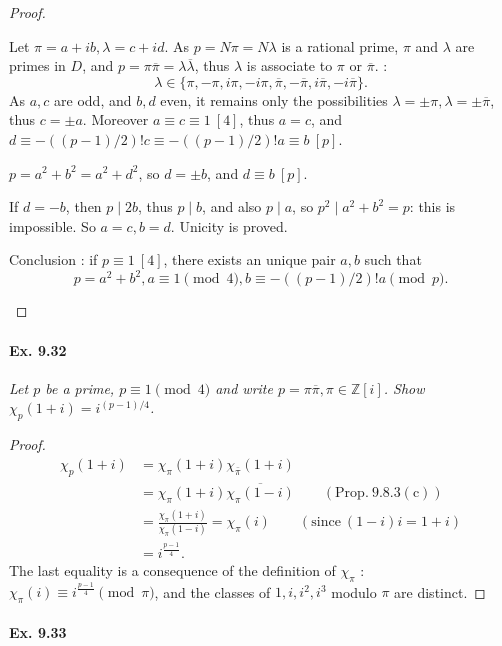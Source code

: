 \documentclass[11pt,a4paper]{article}
\newcommand{\Z}{\mathbb{Z}}
\begin{document}
\begin{proof}
\begin{enumerate}
Let $\pi = a + ib, \lambda = c+id$. As $p = N\pi = N \lambda$ is a rational prime, $\pi$ and $\lambda$ are primes in $D$, and $p = \pi \overline{\pi} = \lambda \overline{\lambda}$, thus $\lambda$ is associate to $\pi$ or $\overline{\pi}$. :
$$\lambda \in \{\pi, - \pi, i \pi, -i\pi, \overline{\pi},-\overline{\pi},i\overline{\pi},-i\overline{\pi}\}.$$
As $a,c$ are odd, and $b,d$ even, it remains only the possibilities $\lambda =\pm \pi, \lambda = \pm \overline{\pi}$, thus $c = \pm a$. Moreover $a \equiv c \equiv 1 \ [4]$, thus $a=c$, and $d \equiv -((p-1)/2)!c \equiv -((p-1)/2)!a \equiv b \ [p]$.

$p=a^2+b^2 = a^2 + d^2$, so $d = \pm b$, and $d \equiv b \ [p]$.

If $d = -b$, then $p\mid 2b$, thus $p \mid b$, and also $p \mid a$, so $p^2 \mid a^2+b^2 = p$: this is impossible. So $a=c,b=d$. Unicity is proved.

Conclusion : if $p\equiv 1 \ [4]$, there exists an unique pair $a,b$ such that
$$p=a^2+b^2, a \equiv 1 \pmod 4, b \equiv -((p-1)/2)! a \pmod p.$$
\end{enumerate}
\end{proof}

\paragraph{Ex. 9.32}

{\it Let $p$ be a prime, $p\equiv 1 \pmod 4$ and write $p = \pi \overline{\pi}, \pi \in \Z[i]$. Show $\chi_p(1+i) = i^{(p-1)/4}$.
}

\begin{proof}


\begin{align*}
\chi_p(1+i) &= \chi_\pi(1+i) \chi_{\bar{\pi}}(1+i) \\
&= \chi_\pi(1+i) \overline{\chi_\pi(1-i)} \qquad ( \mathrm{Prop.}\  \mathrm{9.8.3(c)})\\
& =\frac{\chi_\pi(1+i)}{\chi_\pi(1-i) }= \chi_\pi(i) \qquad (\mathrm{since}\  (1-i)i = 1+i)\\
&=i^{\frac{p-1}{4}}.
\end{align*}
The last equality is a consequence of the definition of $\chi_\pi$ : $\chi_\pi(i) \equiv i^{\frac{p-1}{4}} \pmod \pi$, and the classes of $1,i,i^2,i^3$ modulo $\pi$ are distinct.
\end{proof}

\paragraph{Ex. 9.33}
\end{document}
